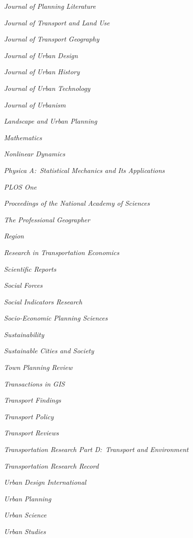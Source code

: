 \documentclass[11pt,letterpaper]{report}
\newcommand{\listitemspace}{0.25em}
\renewenvironment{itemize}
{\begin{list}{}{\setlength{\leftmargin}{0em}
                \setlength{\parskip}{0em}
                \setlength{\itemsep}{\listitemspace}
                \setlength{\parsep}{\listitemspace}}}
{\end{list}}
\begin{document}
\begin{itemize}
        \item \textit{Journal of Planning Literature}
        \item \textit{Journal of Transport and Land Use}
        \item \textit{Journal of Transport Geography}
        \item \textit{Journal of Urban Design}
        \item \textit{Journal of Urban History}
        \item \textit{Journal of Urban Technology}
        \item \textit{Journal of Urbanism}
        \item \textit{Landscape and Urban Planning}
        \item \textit{Mathematics}
        \item \textit{Nonlinear Dynamics}
        \item \textit{Physica A:\ Statistical Mechanics and Its Applications}
        \item \textit{PLOS One}
        \item \textit{Proceedings of the National Academy of Sciences}
        \item \textit{The Professional Geographer}
        \item \textit{Region}
        \item \textit{Research in Transportation Economics}
        \item \textit{Scientific Reports}
        \item \textit{Social Forces}
        \item \textit{Social Indicators Research}
        \item \textit{Socio-Economic Planning Sciences}
        \item \textit{Sustainability}
        \item \textit{Sustainable Cities and Society}
        \item \textit{Town Planning Review}
        \item \textit{Transactions in GIS}
        \item \textit{Transport Findings}
        \item \textit{Transport Policy}
        \item \textit{Transport Reviews}
        \item \textit{Transportation Research Part D:\ Transport and Environment}
        \item \textit{Transportation Research Record}
        \item \textit{Urban Design International}
        \item \textit{Urban Planning}
        \item \textit{Urban Science}
        \item \textit{Urban Studies}

    \end{itemize}
\end{document}
